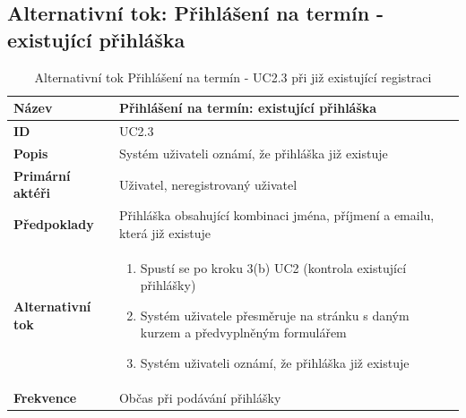 \documentclass[12pt,a4paper,titlepage,final]{report}
\begin{document}
\newpage

\subsection{Alternativní tok: Přihlášení na termín - existující přihláška}
\begin{table}[!h]
	\begin{center}
    \begin{tabular}{ | p{4.5cm} | p{13cm} | }
    \hline
    \textbf{Název} & Přihlášení na termín: existující přihláška
    \\ \hline
    
	\textbf{ID} & UC2.3
	\\ \hline
	
	\textbf{Popis} & Systém uživateli oznámí, že přihláška již existuje
	\\ \hline
	    
	\textbf{Primární aktéři} & Uživatel, neregistrovaný uživatel
	\\ \hline
	
	
	\textbf{Předpoklady} & Přihláška obsahující kombinaci jména, příjmení a emailu, která již existuje
    \\ \hline    
               
    \textbf{Alternativní tok} & 
    \vspace{-3.5mm}
	\begin{enumerate}
        \itemsep0em 	
		\item Spustí se po kroku 3(b) UC2 (kontrola existující přihlášky)
		\item Systém uživatele přesměruje na stránku s daným kurzem a předvyplněným formulářem
		\item Systém uživateli oznámí, že přihláška již existuje
	\end{enumerate}	     
    \\ \hline    
    
	\textbf{Frekvence} & Občas při podávání přihlášky
	\\ \hline
	\end{tabular}
		\caption{Alternativní tok Přihlášení na termín - UC2.3 při již existující registraci}
	\end{center}

\end{table}
\end{document}
